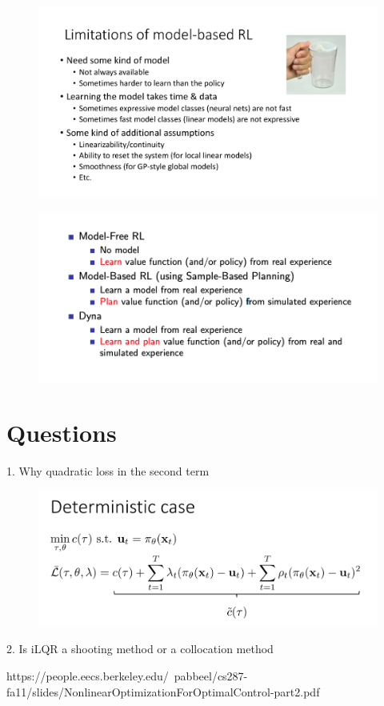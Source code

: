 \documentclass{article}
\begin{document}
\begin{figure}[H]
    \centering
        \includegraphics[width=0.8\linewidth]{img/model-based-limitations.png}
\end{figure}

\begin{figure}[H]
    \centering
        \includegraphics[width=0.8\linewidth]{img/summary.png}
\end{figure}

\section{Questions}

1. Why quadratic loss in the second term
\begin{figure}[H]
    \centering
        \includegraphics[width=0.8\linewidth]{img/deterministic.png}
\end{figure}

2. Is iLQR a shooting method or a collocation method

https://people.eecs.berkeley.edu/~pabbeel/cs287-fa11/slides/NonlinearOptimizationForOptimalControl-part2.pdf

\small


\end{document}
